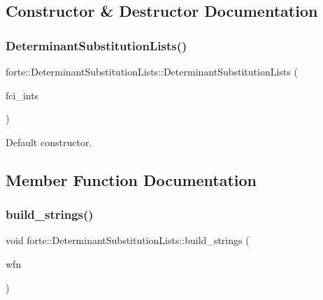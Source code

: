 \subsection{Constructor \& Destructor Documentation}
\mbox{\label{classforte_1_1_determinant_substitution_lists_a35a24415ca3d45669f01afcbb365b12d}} 
\subsubsection{\texorpdfstring{Determinant\+Substitution\+Lists()}{DeterminantSubstitutionLists()}}
{\footnotesize\ttfamily forte\+::\+Determinant\+Substitution\+Lists\+::\+Determinant\+Substitution\+Lists (\begin{DoxyParamCaption}\item[{std\+::shared\+\_\+ptr$<$ \mbox{\hyperlink{classforte_1_1_active_space_integrals}{Active\+Space\+Integrals}} $>$}]{fci\+\_\+ints }\end{DoxyParamCaption})}



Default constructor. 



\subsection{Member Function Documentation}
\mbox{\label{classforte_1_1_determinant_substitution_lists_a70a51832932974071ae62cd720632b42}} 
\subsubsection{\texorpdfstring{build\+\_\+strings()}{build\_strings()}}
{\footnotesize\ttfamily void forte\+::\+Determinant\+Substitution\+Lists\+::build\+\_\+strings (\begin{DoxyParamCaption}\item[{const \mbox{\hyperlink{classforte_1_1_determinant_hash_vec}{Determinant\+Hash\+Vec}} \&}]{wfn }\end{DoxyParamCaption})}

